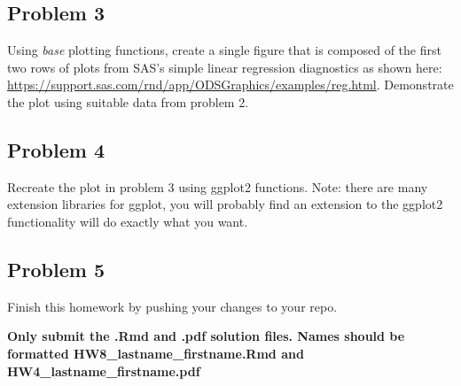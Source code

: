 \documentclass[]{article}
\begin{document}
\hypertarget{problem-3-1}{%
\subsection{Problem 3}\label{problem-3-1}}

Using \emph{base} plotting functions, create a single figure that is
composed of the first two rows of plots from SAS's simple linear
regression diagnostics as shown here:
\url{https://support.sas.com/rnd/app/ODSGraphics/examples/reg.html}.
Demonstrate the plot using suitable data from problem 2.

\hypertarget{problem-4}{%
\subsection{Problem 4}\label{problem-4}}

Recreate the plot in problem 3 using ggplot2 functions. Note: there are
many extension libraries for ggplot, you will probably find an extension
to the ggplot2 functionality will do exactly what you want.

\hypertarget{problem-5}{%
\subsection{Problem 5}\label{problem-5}}

Finish this homework by pushing your changes to your repo.

\textbf{Only submit the .Rmd and .pdf solution files. Names should be
formatted HW8\_lastname\_firstname.Rmd and HW4\_lastname\_firstname.pdf}
\end{document}
